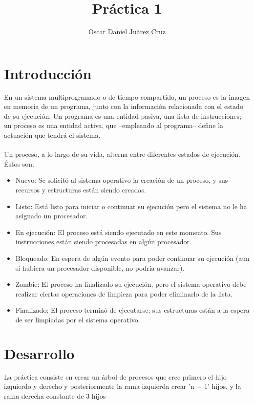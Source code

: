 \documentclass[10pt,a4paper]{article}
\author{Oscar Daniel Juárez Cruz}
\title{Práctica 1}
\begin{document}
\maketitle

\section{Introducción}
En un sistema multiprogramado o de tiempo compartido, un proceso es la
imagen en memoria de un programa, junto con la información relacionada con
el estado de su ejecución.
Un programa es una entidad pasiva, una lista de instrucciones; un proceso
es una entidad activa, que –empleando al programa– define la actuación que
tendrá el sistema. \\\\
Un proceso, a lo largo de su vida, alterna entre diferentes estados de ejecución.
Éstos son: \\
\begin{itemize}
	\item Nuevo: Se solicitó al sistema operativo la creación de un proceso, y sus recursos y estructuras están siendo creadas.
	\item Listo: Está listo para iniciar o continuar su ejecución pero el sistema no le ha asignado un procesador.
	\item En ejecución: El proceso está siendo ejecutado en este momento. Sus instrucciones están siendo procesadas en algún procesador.
	\item Bloqueado: En espera de algún evento para poder continuar su ejecución (aun si hubiera un procesador disponible, no podría avanzar).
	\item Zombie: El proceso ha finalizado su ejecución, pero el sistema operativo debe realizar ciertas operaciones de limpieza para poder eliminarlo de la lista.
	\item Finalizado: El proceso terminó de ejecutarse; sus estructuras están a la espera de ser limpiadas por el sistema operativo.
\end{itemize}
\newpage

\section{Desarrollo}

\begin{flushleft}
La práctica consiste en crear un árbol de procesos que cree primero el hijo izquierdo y derecho y posteriormente la rama izquierda crear 'n + 1' hijos, y la rama derecha constante de 3 hijos
\end{flushleft}
\end{document}
